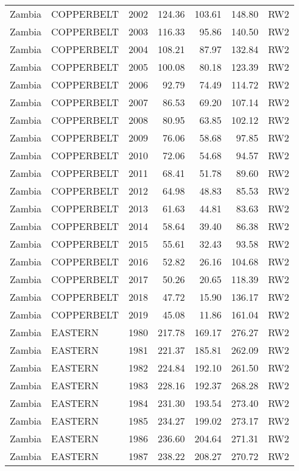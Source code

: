 \begin{longtable}{lllrrrl}
  Zambia & COPPERBELT & 2002 & 124.36 & 103.61 & 148.80 & RW2 \\ 
  Zambia & COPPERBELT & 2003 & 116.33 & 95.86 & 140.50 & RW2 \\ 
  Zambia & COPPERBELT & 2004 & 108.21 & 87.97 & 132.84 & RW2 \\ 
  Zambia & COPPERBELT & 2005 & 100.08 & 80.18 & 123.39 & RW2 \\ 
  Zambia & COPPERBELT & 2006 & 92.79 & 74.49 & 114.72 & RW2 \\ 
  Zambia & COPPERBELT & 2007 & 86.53 & 69.20 & 107.14 & RW2 \\ 
  Zambia & COPPERBELT & 2008 & 80.95 & 63.85 & 102.12 & RW2 \\ 
  Zambia & COPPERBELT & 2009 & 76.06 & 58.68 & 97.85 & RW2 \\ 
  Zambia & COPPERBELT & 2010 & 72.06 & 54.68 & 94.57 & RW2 \\ 
  Zambia & COPPERBELT & 2011 & 68.41 & 51.78 & 89.60 & RW2 \\ 
  Zambia & COPPERBELT & 2012 & 64.98 & 48.83 & 85.53 & RW2 \\ 
  Zambia & COPPERBELT & 2013 & 61.63 & 44.81 & 83.63 & RW2 \\ 
  Zambia & COPPERBELT & 2014 & 58.64 & 39.40 & 86.38 & RW2 \\ 
  Zambia & COPPERBELT & 2015 & 55.61 & 32.43 & 93.58 & RW2 \\ 
  Zambia & COPPERBELT & 2016 & 52.82 & 26.16 & 104.68 & RW2 \\ 
  Zambia & COPPERBELT & 2017 & 50.26 & 20.65 & 118.39 & RW2 \\ 
  Zambia & COPPERBELT & 2018 & 47.72 & 15.90 & 136.17 & RW2 \\ 
  Zambia & COPPERBELT & 2019 & 45.08 & 11.86 & 161.04 & RW2 \\ 
  Zambia & EASTERN & 1980 & 217.78 & 169.17 & 276.27 & RW2 \\ 
  Zambia & EASTERN & 1981 & 221.37 & 185.81 & 262.09 & RW2 \\ 
  Zambia & EASTERN & 1982 & 224.84 & 192.10 & 261.50 & RW2 \\ 
  Zambia & EASTERN & 1983 & 228.16 & 192.37 & 268.28 & RW2 \\ 
  Zambia & EASTERN & 1984 & 231.30 & 193.54 & 273.40 & RW2 \\ 
  Zambia & EASTERN & 1985 & 234.27 & 199.02 & 273.17 & RW2 \\ 
  Zambia & EASTERN & 1986 & 236.60 & 204.64 & 271.31 & RW2 \\ 
  Zambia & EASTERN & 1987 & 238.22 & 208.27 & 270.72 & RW2 \\ 

\end{longtable}
